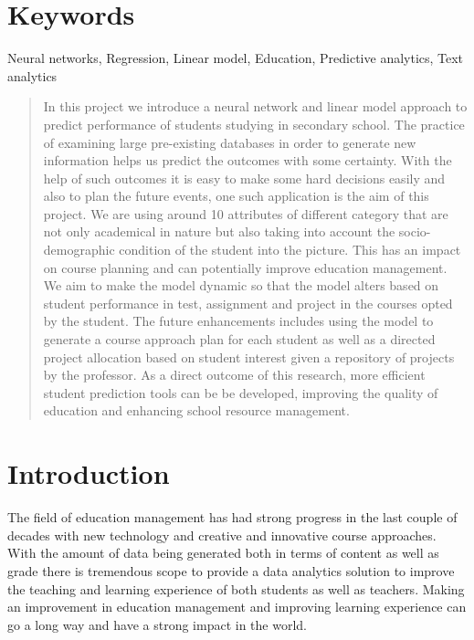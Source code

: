 \documentclass[conference]{IEEEtran}
\begin{document}
	\section*{Keywords}                       
Neural networks,                     
Regression,
Linear model,
Education,
Predictive analytics,
Text analytics\\
\newline	%
	\begin{abstract}
In this project we introduce a neural network and linear model approach to predict performance of students studying in secondary school. The practice of examining large pre-existing databases in order to generate new information helps us predict the outcomes with some certainty. With the help of such outcomes it is easy to make some hard decisions easily and also to plan the future events, one such application is the aim of this project. We are using around 10 attributes of different category that are not only academical in nature but also taking into account the socio-demographic condition of the student into the picture. 
This has an impact on course planning and can potentially improve education management. We aim to make the model dynamic so that the model alters based on student performance in test, assignment and project in the courses opted by the student. The future enhancements includes using the model to generate a course approach plan for each student as well as a directed project allocation based on student interest given a repository of projects by the professor. As a direct outcome of this research, more efficient student prediction tools can be be developed, improving the quality of education and enhancing school resource management.

	\end{abstract}

	\section{Introduction}
The field of education management has had strong progress in the last couple of decades with new technology and creative and innovative course approaches. With the amount of data being generated both in terms of content as well as grade there is tremendous scope to provide a data analytics solution to improve the teaching and learning experience of both students as well as teachers. Making an improvement in education management and improving learning experience can go a long way and have a strong impact in the world.
\end{document}
